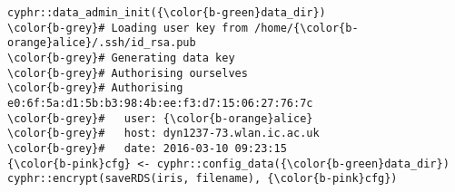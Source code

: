 \documentclass[class=minimal,border=0]{standalone}
\begin{document}
%
\begin{BVerbatim}[bgcolor=b-darkgrey]
cyphr::data_admin_init({\color{b-green}data_dir})
\color{b-grey}# Loading user key from /home/{\color{b-orange}alice}/.ssh/id_rsa.pub
\color{b-grey}# Generating data key
\color{b-grey}# Authorising ourselves
\color{b-grey}# Authorising e0:6f:5a:d1:5b:b3:98:4b:ee:f3:d7:15:06:27:76:7c
\color{b-grey}#   user: {\color{b-orange}alice}
\color{b-grey}#   host: dyn1237-73.wlan.ic.ac.uk
\color{b-grey}#   date: 2016-03-10 09:23:15
{\color{b-pink}cfg} <- cyphr::config_data({\color{b-green}data_dir})
cyphr::encrypt(saveRDS(iris, filename), {\color{b-pink}cfg})
\end{BVerbatim}
\end{document}
